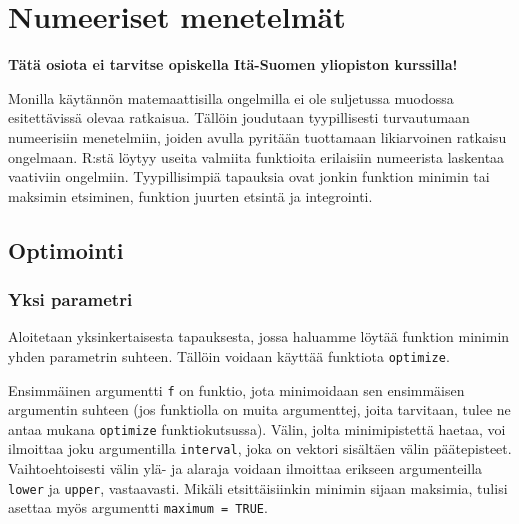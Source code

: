 \documentclass[
]{book}
\newenvironment{Shaded}{\begin{snugshade}}{\end{snugshade}}
\newcommand{\AttributeTok}[1]{\textcolor[rgb]{0.77,0.63,0.00}{#1}}
\newcommand{\ConstantTok}[1]{\textcolor[rgb]{0.00,0.00,0.00}{#1}}
\newcommand{\FloatTok}[1]{\textcolor[rgb]{0.00,0.00,0.81}{#1}}
\newcommand{\FunctionTok}[1]{\textcolor[rgb]{0.00,0.00,0.00}{#1}}
\newcommand{\NormalTok}[1]{#1}
\newcommand{\SpecialCharTok}[1]{\textcolor[rgb]{0.00,0.00,0.00}{#1}}
\begin{document}
\hypertarget{numerical}{%
\chapter{Numeeriset menetelmät}\label{numerical}}

\textbf{Tätä osiota ei tarvitse opiskella Itä-Suomen yliopiston kurssilla!}

Monilla käytännön matemaattisilla ongelmilla ei ole suljetussa muodossa esitettävissä olevaa ratkaisua. Tällöin joudutaan tyypillisesti turvautumaan numeerisiin menetelmiin, joiden avulla pyritään tuottamaan likiarvoinen ratkaisu ongelmaan. R:stä löytyy useita valmiita funktioita erilaisiin numeerista laskentaa vaativiin ongelmiin. Tyypillisimpiä tapauksia ovat jonkin funktion minimin tai maksimin etsiminen, funktion juurten etsintä ja integrointi.

\hypertarget{optimointi}{%
\section{Optimointi}\label{optimointi}}

\hypertarget{yksi-parametri}{%
\subsection{Yksi parametri}\label{yksi-parametri}}

Aloitetaan yksinkertaisesta tapauksesta, jossa haluamme löytää funktion minimin yhden parametrin suhteen. Tällöin voidaan käyttää funktiota \texttt{optimize}.

\begin{Shaded}
\end{Shaded}

Ensimmäinen argumentti \texttt{f} on funktio, jota minimoidaan sen ensimmäisen argumentin suhteen (jos funktiolla on muita argumenttej, joita tarvitaan, tulee ne antaa mukana \texttt{optimize} funktiokutsussa). Välin, jolta minimipistettä haetaa, voi ilmoittaa joku argumentilla \texttt{interval}, joka on vektori sisältäen välin päätepisteet. Vaihtoehtoisesti välin ylä- ja alaraja voidaan ilmoittaa erikseen argumenteilla \texttt{lower} ja \texttt{upper}, vastaavasti. Mikäli etsittäisiinkin minimin sijaan maksimia, tulisi asettaa myös argumentti \texttt{maximum\ =\ TRUE}.
\end{document}
